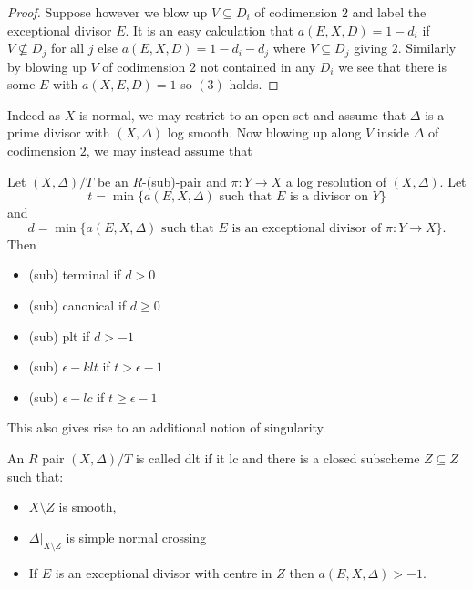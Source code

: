 \documentclass[a4paper,12pt]{book}
\begin{document}
\begin{proof}
	 Suppose however we blow up $V\subseteq D_{i}$ of codimension $2$ and label the exceptional divisor $E$. It is an easy calculation that $a(E,X,D)=1-d_{i}$ if $V\not\subseteq D_{j}$ for all $j$ else $a(E,X,D)=1-d_{i}-d_{j}$ where $V \subseteq D_{j}$ giving $2$. Similarly by blowing up $V$ of codimension $2$ not contained in any $D_{i}$ we see that there is some $E$ with $a(X,E,D)=1$ so $(3)$ holds.
	 
\end{proof}


 Indeed as $X$ is normal, we may restrict to an open set and assume that $\Delta$ is a prime divisor with $(X,\Delta)$ log smooth. Now blowing up along $V$ inside $\Delta$ of codimension $2$, we may instead assume that 

\begin{corollary}
	Let $(X,\Delta)/T$ be an $R$-(sub)-pair and $\pi:Y\to X$ a log resolution of $(X,\Delta)$. Let $$t=\min\{a(E,X,\Delta) \text{ such that } E \text{ is a divisor on } Y\}$$ and $$d=\min\{a(E,X,\Delta) \text{ such that } E \text{ is an exceptional divisor of } \pi:Y\to X\}.$$
	Then
		\begin{itemize}
		\item 	(sub) terminal if $d > 0$
		\item	(sub) canonical if $d\geq 0$
		\item 	(sub) plt if $d > -1$
		\item	(sub) $\epsilon-klt$ if $t > \epsilon-1$
		\item	(sub) $\epsilon-lc$ if $t\geq \epsilon -1$
	\end{itemize}
\end{corollary}

This also gives rise to an additional notion of singularity.

\begin{definition}
	An $R$ pair $(X,\Delta)/T$ is called dlt if it lc and there is a closed subscheme $Z \subseteq Z$ such that:
	
	\begin{itemize}
		\item $X\setminus Z$ is smooth, 
		\item $\Delta|_{X\setminus Z}$ is simple normal crossing
		\item If $E$ is an exceptional divisor with centre in $Z$ then $a(E,X,\Delta) > -1$.
	\end{itemize}
	
	
	 
\end{definition}
\end{document}
